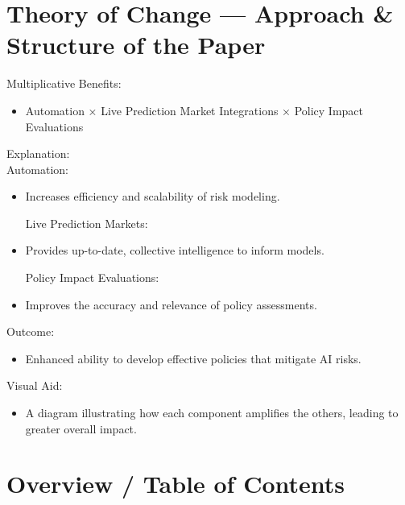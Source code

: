 \documentclass[
  letterpaper,
]{book}
\providecommand{\tightlist}{%
  \setlength{\itemsep}{0pt}\setlength{\parskip}{0pt}}
\begin{document}
\section{Theory of Change --- Approach \& Structure of the
Paper}\label{theory-of-change-approach-structure-of-the-paper}

Multiplicative Benefits:

\begin{itemize}
\tightlist
\item
  Automation × Live Prediction Market Integrations × Policy Impact
  Evaluations
\end{itemize}

Explanation:\\
Automation:

\begin{itemize}
\item
  Increases efficiency and scalability of risk modeling.

  Live Prediction Markets:
\item
  Provides up-to-date, collective intelligence to inform models.

  Policy Impact Evaluations:
\item
  Improves the accuracy and relevance of policy assessments.
\end{itemize}

Outcome:

\begin{itemize}
\tightlist
\item
  Enhanced ability to develop effective policies that mitigate AI risks.
\end{itemize}

Visual Aid:

\begin{itemize}
\tightlist
\item
  A diagram illustrating how each component amplifies the others,
  leading to greater overall impact.
\end{itemize}

\section{}\label{section}

\section{Overview / Table of Contents}\label{overview-table-of-contents}

\end{document}
